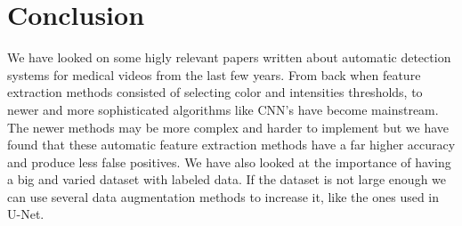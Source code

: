 \documentclass[english, a4paper]{article}
\begin{document}
\section{Conclusion} \label{conclusion}
We have looked on some higly relevant papers written about automatic detection systems for medical videos from the last few years. From back when feature extraction methods consisted of selecting color and intensities thresholds, to newer and more sophisticated algorithms like CNN's have become mainstream. The newer methods may be more complex and harder to implement but we have found that these automatic feature extraction methods have a far higher accuracy and produce less false positives. We have also looked at the importance of having a big and varied dataset with labeled data. If the dataset is not large enough we can use several data augmentation methods to increase it, like the ones used in U-Net. 



\newpage
\printbibliography[heading=bibintoc]
\end{document}
